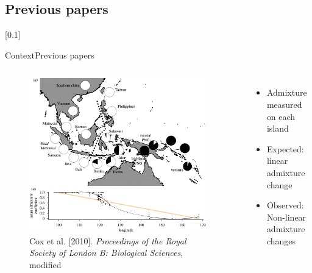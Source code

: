 \documentclass[10pt, aspectratio=43]{beamer}
\begin{document}
\subsection{Previous papers}
[0.1]{}{}{}
\begin{frame}{Context}{Previous papers}
\begin{columns}
  \begin{figure}
    \includegraphics[width=0.95\textwidth]{../data/cox-image-modified.jpg}
    \caption{Cox et al. [2010]. \textit{Proceedings of
the Royal Society of London B: Biological Sciences}, modified}
  \end{figure}

  \begin{itemize}
    \item Admixture measured on each island	
  	  \item Expected: linear admixture change
    \item Observed: Non-linear admixture changes
  \end{itemize}

\end{columns}
\end{frame}
\end{document}
